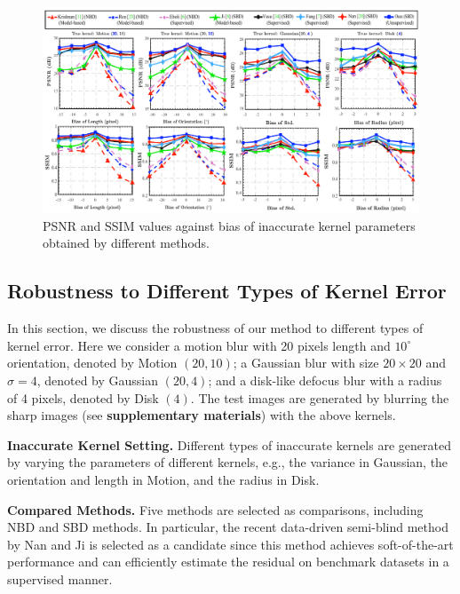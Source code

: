 \documentclass[10pt,twocolumn,letterpaper]{article}
\begin{document}
	\begin{figure}[!t]
		\centering
		\includegraphics[scale=0.845]{Robust2.pdf}
		\caption{PSNR and SSIM values against bias of inaccurate kernel parameters obtained by different methods. }
		\label{Rob}
	\end{figure} 
	\subsection{Robustness to Different Types of Kernel Error}
	
	In this section, we discuss the robustness of our method to different types of kernel error. Here we consider  a motion blur with 20 pixels length and $10^\circ$ orientation, denoted by Motion $(20,10)$; a Gaussian blur with size $20\times20$ and $\sigma=4$, denoted by Gaussian $(20,4)$; and a disk-like defocus blur with a radius of 4 pixels, denoted by Disk $(4)$. The test images are generated by blurring the sharp images (see \textbf{supplementary materials}) with the above kernels.
	
	\noindent\textbf{Inaccurate Kernel Setting.} Different types of inaccurate kernels are generated by varying the parameters of different kernels, e.g., the  variance in Gaussian, the orientation and length in Motion, and the radius in Disk. 
	
	\noindent\textbf{Compared Methods.} Five methods are selected as comparisons, including NBD  \cite{krishnan2009fast,ren2015fast} and SBD \cite{vasu2018non,ji2011robust, nan2020deep} methods. In particular, the recent data-driven semi-blind method by Nan and Ji \cite{nan2020deep} is selected as a candidate since this method achieves soft-of-the-art performance and can efficiently estimate the residual on benchmark datasets in a supervised manner.
	
\end{document}
